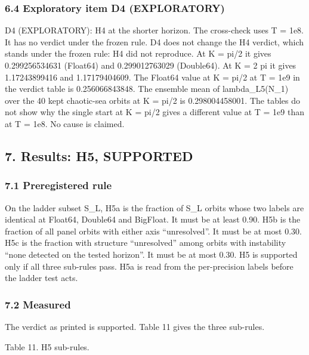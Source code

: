 \documentclass[
  11pt,
]{article}
\newcounter{none} %
\begin{document}
\subsubsection{6.4 Exploratory item D4
(EXPLORATORY)}\label{exploratory-item-d4-exploratory}

D4 (EXPLORATORY): H4 at the shorter horizon. The cross-check uses T =
1e8. It has no verdict under the frozen rule. D4 does not change the H4
verdict, which stands under the frozen rule: H4 did not reproduce. At K
= pi/2 it gives 0.299256534631 (Float64) and 0.299012763029 (Double64).
At K = 2 pi it gives 1.17243899416 and 1.17179404609. The Float64 value
at K = pi/2 at T = 1e9 in the verdict table is 0.256066843848. The
ensemble mean of lambda\_L5(N\_1) over the 40 kept chaotic-sea orbits at
K = pi/2 is 0.298004458001. The tables do not show why the single start
at K = pi/2 gives a different value at T = 1e9 than at T = 1e8. No cause
is claimed.

\subsection{7. Results: H5, SUPPORTED}\label{results-h5-supported}

\subsubsection{7.1 Preregistered rule}\label{preregistered-rule-4}

On the ladder subset S\_L, H5a is the fraction of S\_L orbits whose two
labels are identical at Float64, Double64 and BigFloat. It must be at
least 0.90. H5b is the fraction of all panel orbits with either axis
``unresolved''. It must be at most 0.30. H5c is the fraction with
structure ``unresolved'' among orbits with instability ``none detected
on the tested horizon''. It must be at most 0.30. H5 is supported only
if all three sub-rules pass. H5a is read from the per-precision labels
before the ladder test acts.

\subsubsection{7.2 Measured}\label{measured-4}

The verdict as printed is supported. Table 11 gives the three sub-rules.

Table 11. H5 sub-rules.
\end{document}
